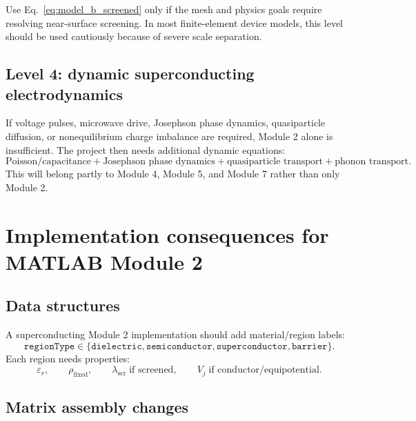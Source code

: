 \documentclass[11pt]{article}
\newcommand{\lams}{\lambda_{\mathrm{scr}}}
\begin{document}
Use Eq.~\eqref{eq:model_b_screened} only if the mesh and physics goals require resolving near-surface screening. In most finite-element device models, this level should be used cautiously because of severe scale separation.

\subsection{Level 4: dynamic superconducting electrodynamics}

If voltage pulses, microwave drive, Josephson phase dynamics, quasiparticle diffusion, or nonequilibrium charge imbalance are required, Module 2 alone is insufficient. The project then needs additional dynamic equations:
\begin{equation}
\text{Poisson/capacitance} + \text{Josephson phase dynamics} + \text{quasiparticle transport} + \text{phonon transport}.
\end{equation}
This will belong partly to Module 4, Module 5, and Module 7 rather than only Module 2.

\section{Implementation consequences for MATLAB Module 2}

\subsection{Data structures}

A superconducting Module 2 implementation should add material/region labels:
\begin{equation}
\texttt{regionType} \in \{\texttt{dielectric},\texttt{semiconductor},\texttt{superconductor},\texttt{barrier}\}.
\end{equation}
Each region needs properties:
\begin{equation}
\varepsilon_r,
\qquad
\rho_{\mathrm{fixed}},
\qquad
\lams\;\text{if screened},
\qquad
V_j\;\text{if conductor/equipotential}.
\end{equation}

\subsection{Matrix assembly changes}
\end{document}
